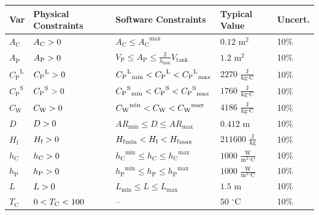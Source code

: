 \documentclass[12pt]{article}
\newcommand{\gt}{\ensuremath >}
\newcommand{\lt}{\ensuremath <}
\begin{document}
\begin{longtabu}{l l X[l] l l}
\toprule
\textbf{Var} & \textbf{Physical Constraints} & \textbf{Software Constraints} & \textbf{Typical Value} & \textbf{Uncert.}
\\
\midrule
\endhead
${A_{\text{C}}}$ & ${A_{\text{C}}}\gt{}0$ & ${A_{\text{C}}}\leq{}{{A_{\text{C}}}^{\text{max}}}$ & $0.12$ ${\text{m}^{2}}$ & 10$\%$
\\
${A_{\text{P}}}$ & ${A_{\text{P}}}\gt{}0$ & ${V_{\text{P}}}\leq{}{A_{\text{P}}}\leq{}\frac{2}{{h_{\text{min}}}} {V_{\text{tank}}}$ & $1.2$ ${\text{m}^{2}}$ & 10$\%$
\\
${{C_{\text{P}}}^{\text{L}}}$ & ${{C_{\text{P}}}^{\text{L}}}\gt{}0$ & ${{{C_{\text{P}}}^{\text{L}}}_{\text{min}}}\lt{}{{C_{\text{P}}}^{\text{L}}}\lt{}{{{C_{\text{P}}}^{\text{L}}}_{\text{max}}}$ & $2270$ $\frac{\text{J}}{\text{kg}{}^{\circ}\text{C}}$ & 10$\%$
\\
${{C_{\text{P}}}^{\text{S}}}$ & ${{C_{\text{P}}}^{\text{S}}}\gt{}0$ & ${{{C_{\text{P}}}^{\text{S}}}_{\text{min}}}\lt{}{{C_{\text{P}}}^{\text{S}}}\lt{}{{{C_{\text{P}}}^{\text{S}}}_{\text{max}}}$ & $1760$ $\frac{\text{J}}{\text{kg}{}^{\circ}\text{C}}$ & 10$\%$
\\
${C_{\text{W}}}$ & ${C_{\text{W}}}\gt{}0$ & ${{C_{\text{W}}}^{\text{min}}}\lt{}{C_{\text{W}}}\lt{}{{C_{\text{W}}}^{\text{max}}}$ & $4186$ $\frac{\text{J}}{\text{kg}{}^{\circ}\text{C}}$ & 10$\%$
\\
$D$ & $D\gt{}0$ & ${AR_{\text{min}}}\leq{}D\leq{}{AR_{\text{max}}}$ & $0.412$ ${\text{m}}$ & 10$\%$
\\
${H_{\text{f}}}$ & ${H_{\text{f}}}\gt{}0$ & ${{H_{\text{f}}}_{\text{min}}}\lt{}{H_{\text{f}}}\lt{}{{H_{\text{f}}}_{\text{max}}}$ & $211600$ $\frac{\text{J}}{\text{kg}}$ & 10$\%$
\\
${h_{\text{C}}}$ & ${h_{\text{C}}}\gt{}0$ & ${{h_{\text{C}}}^{\text{min}}}\leq{}{h_{\text{C}}}\leq{}{{h_{\text{C}}}^{\text{max}}}$ & $1000$ $\frac{\text{W}}{\text{m}^{2}{}^{\circ}\text{C}}$ & 10$\%$
\\
${h_{\text{P}}}$ & ${h_{\text{P}}}\gt{}0$ & ${{h_{\text{P}}}^{\text{min}}}\leq{}{h_{\text{P}}}\leq{}{{h_{\text{P}}}^{\text{max}}}$ & $1000$ $\frac{\text{W}}{\text{m}^{2}{}^{\circ}\text{C}}$ & 10$\%$
\\
$L$ & $L\gt{}0$ & ${L_{\text{min}}}\leq{}L\leq{}{L_{\text{max}}}$ & $1.5$ ${\text{m}}$ & 10$\%$
\\
${T_{\text{C}}}$ & $0\lt{}{T_{\text{C}}}\lt{}100$ & -- & $50$ ${{}^{\circ}\text{C}}$ & 10$\%$
\\

\end{longtabu}
\end{document}
